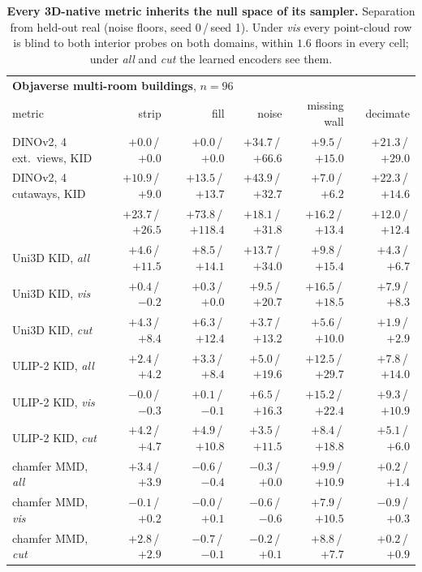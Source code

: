 \begin{table}[t]
\centering
\footnotesize
\caption{\textbf{Every 3D-native metric inherits the null space of its sampler.}
Separation from held-out real (noise floors, seed 0\,/\,seed 1). Under \emph{vis} every
point-cloud row is blind to both interior probes on both domains, within $1.6$ floors in
every cell; under \emph{all} and \emph{cut} the learned encoders see them.}
\label{tab:probe3d}
\begin{tabular}{lrrrrr}
\toprule
\multicolumn{6}{l}{\textbf{Objaverse multi-room buildings}, $n{=}96$} \\
metric & strip & fill & noise & missing wall & decimate \\
\midrule
DINOv2, 4 ext.\ views, KID & $+0.0$\,/\,$+0.0$ & $+0.0$\,/\,$+0.0$ & $+34.7$\,/\,$+66.6$ & $+9.5$\,/\,$+15.0$ & $+21.3$\,/\,$+29.0$ \\
DINOv2, 4 cutaways, KID & $+10.9$\,/\,$+9.0$ & $+13.5$\,/\,$+13.7$ & $+43.9$\,/\,$+32.7$ & $+7.0$\,/\,$+6.2$ & $+22.3$\,/\,$+14.6$ \\
\vkid{} & $+23.7$\,/\,$+26.5$ & $+73.8$\,/\,$+118.4$ & $+18.1$\,/\,$+31.8$ & $+16.2$\,/\,$+13.4$ & $+12.0$\,/\,$+12.4$ \\
Uni3D KID, \emph{all} & $+4.6$\,/\,$+11.5$ & $+8.5$\,/\,$+14.1$ & $+13.7$\,/\,$+34.0$ & $+9.8$\,/\,$+15.4$ & $+4.3$\,/\,$+6.7$ \\
Uni3D KID, \emph{vis} & $+0.4$\,/\,$-0.2$ & $+0.3$\,/\,$+0.0$ & $+9.5$\,/\,$+20.7$ & $+16.5$\,/\,$+18.5$ & $+7.9$\,/\,$+8.3$ \\
Uni3D KID, \emph{cut} & $+4.3$\,/\,$+8.4$ & $+6.3$\,/\,$+12.4$ & $+3.7$\,/\,$+13.2$ & $+5.6$\,/\,$+10.0$ & $+1.9$\,/\,$+2.9$ \\
ULIP-2 KID, \emph{all} & $+2.4$\,/\,$+4.2$ & $+3.3$\,/\,$+8.4$ & $+5.0$\,/\,$+19.6$ & $+12.5$\,/\,$+29.7$ & $+7.8$\,/\,$+14.0$ \\
ULIP-2 KID, \emph{vis} & $-0.0$\,/\,$-0.3$ & $+0.1$\,/\,$-0.1$ & $+6.5$\,/\,$+16.3$ & $+15.2$\,/\,$+22.4$ & $+9.3$\,/\,$+10.9$ \\
ULIP-2 KID, \emph{cut} & $+4.2$\,/\,$+4.7$ & $+4.9$\,/\,$+10.8$ & $+3.5$\,/\,$+11.5$ & $+8.4$\,/\,$+18.8$ & $+5.1$\,/\,$+6.0$ \\
chamfer MMD, \emph{all} & $+3.4$\,/\,$+3.9$ & $-0.6$\,/\,$-0.4$ & $-0.3$\,/\,$+0.0$ & $+9.9$\,/\,$+10.9$ & $+0.2$\,/\,$+1.4$ \\
chamfer MMD, \emph{vis} & $-0.1$\,/\,$+0.2$ & $-0.0$\,/\,$+0.1$ & $-0.6$\,/\,$-0.6$ & $+7.9$\,/\,$+10.5$ & $-0.9$\,/\,$+0.3$ \\
chamfer MMD, \emph{cut} & $+2.8$\,/\,$+2.9$ & $-0.7$\,/\,$-0.1$ & $-0.2$\,/\,$+0.1$ & $+8.8$\,/\,$+7.7$ & $+0.2$\,/\,$+0.9$ \\

\end{tabular}
\end{table}
